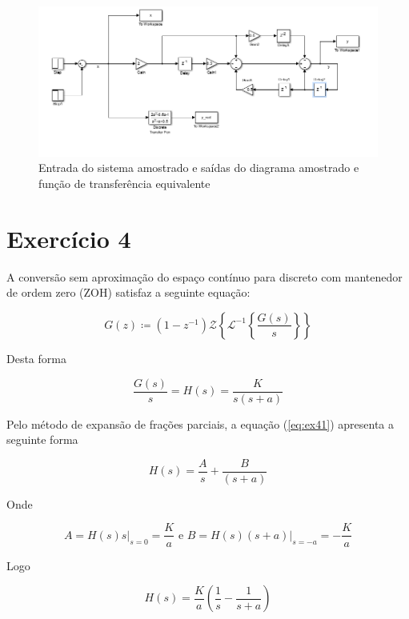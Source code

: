 \documentclass{article}
\begin{document}
\begin{figure}[!h]
	\center
	\includegraphics[width=\textwidth]{./images/ex3simulink.tif}
	\caption{Entrada do sistema amostrado e saídas do diagrama amostrado e função de transferência equivalente}
	\label{fig:ex3diag}
\end{figure}

\section*{Exercício 4}

A conversão sem aproximação do espaço contínuo para discreto com mantenedor de ordem zero (ZOH) satisfaz a seguinte equação:

\begin{equation}
G(z) \coloneqq (1-z^{-1}) \mathcal{Z}\left\{\mathcal{L}^{-1}\left\{\frac{G(s)}{s}\right\}\right\}
\end{equation}

Desta forma

\begin{equation}
\label{eq:ex41}
\frac{G(s)}{s} = H(s) = \frac{K}{s(s+a)}
\end{equation}

Pelo método de expansão de frações parciais, a equação (\ref{eq:ex41}) apresenta a seguinte forma

\begin{equation}
H(s) = \frac{A}{s} + \frac{B}{(s+a)} 
\end{equation}

Onde 

\begin{equation}
A = H(s) s \bigg\rvert_{s=0} = \frac{K}{a} \mbox{ e } B = H(s) (s+a)\bigg\rvert_{s=-a} = -\frac{K}{a}
\end{equation}

Logo

\begin{equation}
H(s) = \frac{K}{a} \left( \frac{1}{s} - \frac{1}{s+a} \right)
\end{equation}
\end{document}
